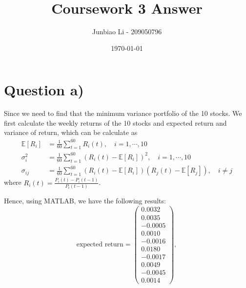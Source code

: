 \documentclass[12pt]{article}
\title{Coursework 3 Answer}
\author{Junbiao Li - 209050796}
\date{\today}
\begin{document}
\maketitle
\tableofcontents

\clearpage
\section{Question a)}

Since we need to find that the minimum variance portfolio of the 10 stocks. We
first calculate the weekly returns of the 10 stocks and expected return and
variance of return, which can be calculate as
\[
    \begin{aligned}
        \mathbb{E}\left[R_i\right] & =\frac{1}{60} \sum_{t=1}^{60} R_i(t),
        \quad i=1, \cdots, 10                                              \\
        \sigma_i^2                 & =\frac{1}{60}
        \sum_{t=1}^{60}\left(R_i(t)-\mathbb{E}\left[R_i\right]\right)^2, \quad
        i=1,
        \cdots, 10                                                         \\
        \sigma_{i j}               & =\frac{1}{60}
        \sum_{t=1}^{60}\left(R_i(t)-\mathbb{E}\left[R_i\right]\right)\left(R_j(t)-\mathbb{E}\left[R_j\right]\right),
        \quad i \neq j
    \end{aligned}
\]
where \(R_i(t)=\frac{P_i(t)-P_i(t-1)}{P_i(t-1)}\).

Hence, using MATLAB, we have the following results:
\[
    \text{expected return} =\left(
    \begin{array}{r}
            0.0032  \\
            0.0035  \\
            -0.0005 \\
            0.0010  \\
            -0.0016 \\
            0.0180  \\
            -0.0017 \\
            0.0049  \\
            -0.0045 \\
            0.0014
        \end{array}\right),
\]
\end{document}
